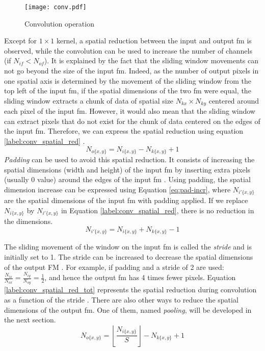 %
\begin{figure}[H]
    \centering
    \texttt{[image: conv.pdf]}
    \caption{Convolution operation}
    \label{fig:convolution}
\end{figure}
%
Except for $1 \times 1$ kernel, a spatial reduction between the input and output \acrshort{fm} is observed, while the convolution can be used to increase the number of channels (if $N_{if} < N_{of}$). It is explained by the fact that the sliding window movements can not go beyond the size of the input \acrshort{fm}. Indeed, as the number of output pixels in one spatial axis is determined by the movement of the sliding window from the top left of the input \acrshort{fm}, if the spatial dimensions of the two \acrshort{fm} were equal, the sliding window extracts a chunk of data of spatial size $N_{kx} \times N_{ky}$ centered around each pixel of the input \acrshort{fm}. However, it would also mean that the sliding window can extract pixels that do not exist for the chunk of data centered on the edges of the input \acrshort{fm}. Therefore, we can express the spatial reduction using equation \eqref{label:conv_spatial_red} \cite{ma_optimizing_2018}.
%
\begin{equation}
    N_{o\{x,y\}} = N_{i\{x,y\}} - N_{k\{x,y\}} + 1
    \label{label:conv_spatial_red}
\end{equation}
%
\textit{Padding} can be used to avoid this spatial reduction. It consists of increasing the spatial dimensions (width and height) of the input \acrshort{fm} by inserting extra pixels (usually 0 value) around the edges of the input \acrshort{fm} \cite{liu_fpga-based_2019}. Using padding, the spatial dimension increase can be expressed using Equation \eqref{eq:pad-incr}, where $N_{i'\{x,y\}}$ are the spatial dimensions of the input \acrshort{fm} with padding applied. If we replace $N_{i\{x,y\}}$ by $N_{i'\{x,y\}}$ in Equation \eqref{label:conv_spatial_red}, there is no reduction in the dimensions.
%
\begin{equation}
    N_{i'\{x,y\}} = N_{i\{x,y\}} + N_{k\{x,y\}} - 1
    \label{eq:pad-incr}
\end{equation}

The sliding movement of the window on the input \acrshort{fm} is called the \textit{stride} and is initially set to 1. The stride can be increased to decrease the spatial dimensions of the output FM \cite{liu_fpga-based_2019}. For example, if padding and a stride of 2 are used: $\frac{N_{ix}}{N_{ox}} = \frac{N_{iy}}{N_{oy}} = \frac{1}{2}$, and hence the output \acrshort{fm} has 4 times fewer pixels. Equation \eqref{label:conv_spatial_red_tot} represents the spatial reduction during convolution as a function of the stride \cite{ma_optimizing_2018}. There are also other ways to reduce the spatial dimensions of the output \acrshort{fm}. One of them, named \textit{pooling}, will be developed in the next section.
%
\begin{equation}
    N_{o\{x,y\}} = \left\lfloor \frac{ N_{i\{x,y\}}}{S} \right\rfloor - N_{k\{x,y\}} + 1
    \label{label:conv_spatial_red_tot}
\end{equation}

